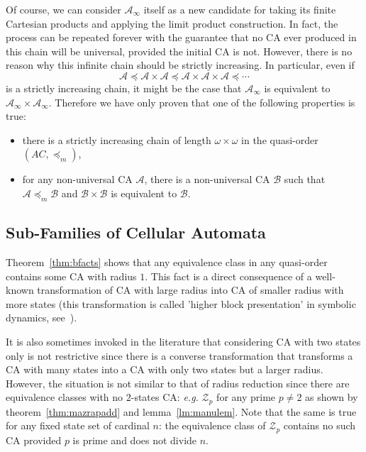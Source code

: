 \documentclass[a4paper]{elsarticle}
\def\qed{\relax\ifmmode\hskip2em \blacksquare\else\unskip\nobreak\hfill\hskip1em $\blacksquare$\fi}
\newcommand{\ACA}{\mathcal{A}}
\newcommand{\ACB}{\mathcal{B}}
\newcommand{\ACU}{\mathcal{U}}
\newcommand{\simu}{\preccurlyeq}
\newcommand{\facsacsimu}{\simu_m}
\newcommand\zee[1]{\mathcal{Z}_{#1}}
\newcommand{\limprod}[1]{{\ACA}_\infty}
\begin{document}

Of course, we can consider $\limprod{\ACA}$ itself as a new candidate
for taking its finite Cartesian products and applying the limit
product construction. In fact, the process can be repeated forever
with the guarantee that no CA ever produced in this chain will be
universal, provided the initial CA is not. However, there is no reason
why this infinite chain should be strictly increasing. In particular,
even if
\[\ACA\simu\ACA\times\ACA\simu\ACA\times\ACA\times\ACA\simu\cdots\]
is a strictly increasing chain, it might be the case that
${\limprod{\ACA}}$ is equivalent to
${\limprod{\ACA}\times\limprod{\ACA}}$. Therefore we have only proven
that one of the following properties is true:
\begin{itemize}
\item there is a strictly increasing chain of length
  $\omega\times\omega$ in the quasi-order ${(AC,\facsacsimu)}$,
\item for any non-universal CA $\ACA$, there is a non-universal CA
  $\ACB$ such that ${\ACA\facsacsimu\ACB}$ and $\ACB\times\ACB$ is
  equivalent to $\ACB$.
\end{itemize}

\subsection{Sub-Families of Cellular Automata}
\label{sec:fam}

Theorem~\ref{thm:bfacts} shows that any equivalence class in any
quasi-order contains some CA with radius $1$. This fact is a direct
consequence of a well-known transformation of CA with large radius
into CA of smaller radius with more states (this transformation is
called 'higher block presentation' in symbolic dynamics,
see~\cite{LindMarcus}).

It is also sometimes invoked in the literature that considering CA
with two states only is not restrictive since there is a converse
transformation that transforms a CA with many states into a CA with
only two states but a larger radius. However, the situation is not
similar to that of radius reduction since there are equivalence
classes with no $2$-states CA: \textit{e.g.}  $\zee{p}$ for any prime
${p\not=2}$ as shown by theorem~\ref{thm:mazrapadd} and
lemma~\ref{lm:manulem}. Note that the same is true for any fixed state
set of cardinal $n$: the equivalence class of $\zee{p}$ contains no
such CA provided $p$ is prime and does not divide $n$.
\end{document}
